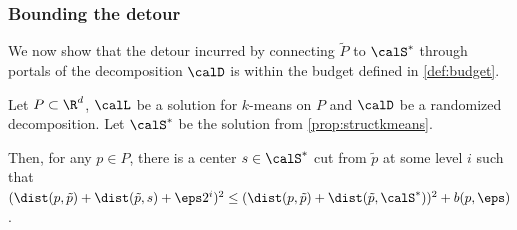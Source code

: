 \subsubsection{Bounding the detour}

We now show that the detour incurred by connecting $\tilde P$ to $\calS^*$ through portals of the decomposition $\calD$ is within the budget defined in \cref{def:budget}. 

\begin{lemma}
  \label{lem:detourkmeans}
Let $P \subset \R^d$, $\calL$ be a solution for $k$-means on $P$ and $\calD$ be a randomized decomposition. 
Let $\calS^*$ be the solution from \cref{prop:structkmeans}.

 Then, for any $p \in P$, there is a center $s \in \calS^*$ cut from $\tilde p$ at some level $i$ such that $(\dist(p, \tilde p) + \dist(\tilde p, s) + \eps 2^i)^2 \leq (\dist(p, \tilde p) + \dist(\tilde p, \calS^*))^2 + b(p, \eps)$.
 \end{lemma}
